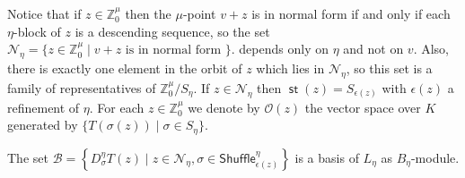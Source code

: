 \documentclass[11pt,fleqn]{article}
\newcommand\ZZ{\mathbb Z}
\newcommand\N{\mathcal N}
\renewcommand\O{\mathcal O}
\newcommand\Shuffle{\mathsf{Shuffle}}
\DeclareMathOperator\st{\mathsf{st}}
\begin{document}
Notice that if $z \in \ZZ^\mu_0$ then the $\mu$-point $v+z$ is in normal form 
if and only if each $\eta$-block of $z$ is a descending sequence, so the set
$\N_\eta = \{z \in \ZZ^\mu_0 \mid v+z \mbox{ is in normal form }\}$.
depends only on $\eta$ and not on $v$. Also, there is exactly one 
element in the orbit of $z$ which lies in $\N_\eta$, so this set is a family
of representatives of $\ZZ^\mu_0 / S_\eta$. If $z \in \N_\eta$ then $\st(z) = 
S_{\epsilon(z)}$ with $\epsilon(z)$ a refinement of $\eta$. For each $z \in 
\ZZ^\mu_0$ we denote by $\O(z)$ the vector space over $K$ generated by 
$\{T(\sigma(z)) \mid \sigma \in S_\eta\}$.
\begin{Lemma*}
The set $\mathcal B =\left\{D_\sigma^\eta T(z) \mid z \in \N_\eta, \sigma \in 
\Shuffle_{\epsilon(z)}^\eta\right\}$ is a basis of $L_\eta$ as $B_\eta$-module.
\end{Lemma*}
\end{document}
